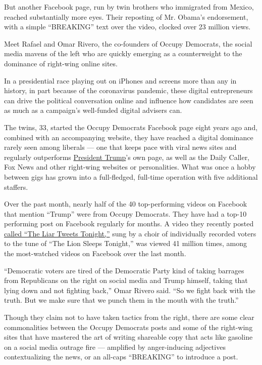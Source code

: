 But another Facebook page, run by twin brothers who immigrated from
Mexico, reached substantially more eyes. Their reposting of Mr. Obama's
endorsement, with a simple ``BREAKING'' text over the video, clocked
over 23 million views.

Meet Rafael and Omar Rivero, the co-founders of Occupy Democrats, the
social media mavens of the left who are quickly emerging as a
counterweight to the dominance of right-wing online sites.

In a presidential race playing out on iPhones and screens more than any
in history, in part because of the coronavirus pandemic, these digital
entrepreneurs can drive the political conversation online and influence
how candidates are seen as much as a campaign's well-funded digital
advisers can.

The twins, 33, started the Occupy Democrats Facebook page eight years
ago and, combined with an accompanying website, they have reached a
digital dominance rarely seen among liberals --- one that keeps pace
with viral news sites and regularly outperforms
\href{https://www.nytimes.com/interactive/2020/us/elections/donald-trump.html}{President
Trump}'s own page, as well as the Daily Caller, Fox News and other
right-wing websites or personalities. What was once a hobby between gigs
has grown into a full-fledged, full-time operation with five additional
staffers.

Over the past month, nearly half of the 40 top-performing videos on
Facebook that mention ``Trump'' were from Occupy Democrats. They have
had a top-10 performing post on Facebook regularly for months. A video
they recently posted
\href{https://www.facebook.com/watch/?v=236673061013278}{called ``The
Liar Tweets Tonight,''} sung by a choir of individually recorded voters
to the tune of ``The Lion Sleeps Tonight,'' was viewed 41 million times,
among the most-watched videos on Facebook over the last month.

``Democratic voters are tired of the Democratic Party kind of taking
barrages from Republicans on the right on social media and Trump
himself, taking that lying down and not fighting back,'' Omar Rivero
said. ``So we fight back with the truth. But we make sure that we punch
them in the mouth with the truth.''

Though they claim not to have taken tactics from the right, there are
some clear commonalities between the Occupy Democrats posts and some of
the right-wing sites that have mastered the art of writing shareable
copy that acts like gasoline on a social media outrage fire ---
amplified by anger-inducing adjectives contextualizing the news, or an
all-caps ``BREAKING'' to introduce a post.

